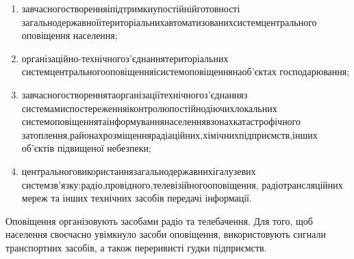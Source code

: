 \begin{enumerate}
	\item завчасного\hfill створення\hfill і\hfill підтримки\hfill у\hfill постійній\hfill готовності\newline \hspace*{-20mm} загальнодержавної\hfill і\hfill територіальних\hfill автоматизованих\hfill систем\hfill центрального\newline \hspace*{-20mm} оповіщення населення;
	\item організаційно-технічного\hfill з’єднання\hfill територіальних\newline \hspace*{-20mm} систем\hfill центрального\hfill оповіщення\hfill і\hfill систем\hfill оповіщення\hfill на\hfill об’єктах\newline \hspace*{-20mm} господарювання;
	\item завчасного\hfill створення\hfill та\hfill організації\hfill технічного\hfill з’єднання\hfill з\newline \hspace*{-20mm} системами\hfill спостереження\hfill і\hfill контролю\hfill постійно\hfill діючих\hfill локальних\newline \hspace*{-20mm} систем\hfill оповіщення\hfill та\hfill інформування\hfill населення\hfill в\hfill зонах\hfill катастрофічного\newline \hspace*{-20mm} затоплення,\hfill районах\hfill розміщення\hfill радіаційних,\hfill хімічних\hfill підприємств,\hfill інших\newline \hspace*{-20mm} об’єктів підвищеної небезпеки;
	\item центрального\hfill використання\hfill загальнодержавних\hfill і\hfill галузевих\newline \hspace*{-20mm} систем\hfill зв’язку:\hfill радіо,\hfill провідного,\hfill телевізійного\hfill оповіщення,\newline \hspace*{-20mm} радіотрансляційних мереж та інших технічних засобів передачі інформації.
\end{enumerate}

Оповіщення організовують засобами радіо та телебачення. Для того, щоб населення своєчасно увімкнуло засоби оповіщення, використовують сигнали транспортних засобів, а також переривисті гудки підприємств.


